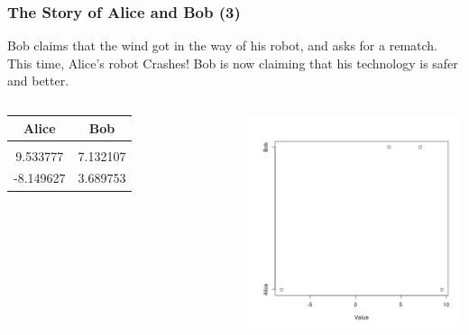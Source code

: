 \documentclass[10pt]{beamer}
\begin{document}
\begin{frame}
  \frametitle{The Story of Alice and Bob (3)}
  \begin{block}{}
    Bob claims that the wind got in the way of his robot, and asks for a rematch.
    This time, Alice's robot Crashes! Bob is now claiming that his technology is 
    safer and better.
  \end{block}
  \begin{columns}[c]
    \begin{tabular}{c|c}
      Alice & Bob \\
      \hline\\
      9.533777 & 7.132107\\
      -8.149627 & 3.689753\\
    \end{tabular}
    \includegraphics[width=1\textwidth]{img/AliceBob_2}
  \end{columns}
\end{frame}
\end{document}
